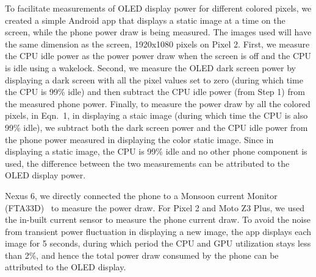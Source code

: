 To facilitate measurements of OLED display power for different colored
pixels, we created a simple Android app that displays a static image
at a time on the screen, while the phone power draw is being measured.
The images used will have the same dimension as the screen, \eg
1920x1080 pixels on Pixel 2.
First, we measure the CPU idle power 
as the power power draw when the screen is off and the CPU is idle using a wakelock.
Second, we measure the OLED dark screen power 
by displaying a dark screen with all the pixel values set to zero
(during which time the CPU is 99\% idle)
and then subtract the CPU idle power (from Step 1) from the measured phone power.
Finally, to measure the power draw by all the colored pixels,
 in Eqn.~1,
in displaying a staic image (during which time the CPU is also 99\% idle),
 we subtract both the dark
screen power and the CPU idle power
from the phone power measured in displaying the color static image.
Since in displaying a static image, the CPU
is 99\% idle and no other phone component is used, the difference
between the two measurements can be attributed to the OLED display power.
\fi



Nexus 6, we directly connected the phone to a Monsoon current
Monitor (FTA33D)~\cite{monsoon} to measure the power draw.  For Pixel
2 and Moto Z3 Plus, we used the in-built current sensor to measure the
phone current draw.  To avoid the noise from transient power
fluctuation in displaying a new image, the app displays each image for
5 seconds, during which period the CPU and GPU utilization stays less
than 2\%, and hence the
total power draw consumed by the phone can be attributed to the OLED
display.
\fi

